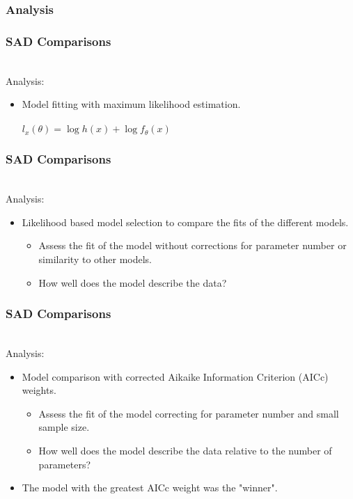 \documentclass[14pt]{beamer}
\begin{document}
\subsubsection{Analysis}
\begin{frame}[t]
\frametitle{SAD Comparisons}
~\\
Analysis:
\begin{itemize}
\item Model fitting with maximum likelihood estimation.\\
~\\
$l_x(\theta) = \log h(x) + \log f_\theta(x)$
\end{itemize}
\end{frame} 


\begin{frame}[t]
\frametitle{SAD Comparisons}
~\\
Analysis:
\begin{itemize}
\item Likelihood based model selection to compare the fits of the different models.
\begin{itemize}
\item Assess the fit of the model without corrections for parameter number or similarity to other models.
\item How well does the model describe the data?
\end{itemize}
\end{itemize}
\end{frame}

\begin{frame}[t]
\frametitle{SAD Comparisons}
~\\
Analysis:
\begin{itemize}
\item Model comparison with corrected Aikaike Information Criterion (AICc) weights.
\begin{itemize}
\item Assess the fit of the model correcting for parameter number and small sample size.
\item How well does the model describe the data relative to the number of parameters?
\end{itemize}
\item The model with the greatest AICc weight was the "winner". 
\end{itemize}
\end{frame}
\end{document}
